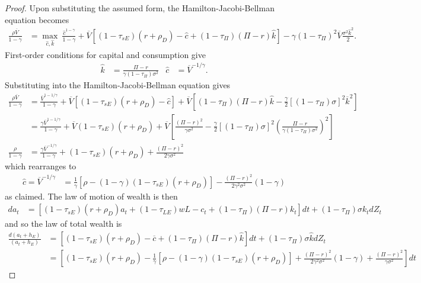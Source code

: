 \documentclass[11pt]{article}
\theoremstyle{plain}
\theoremstyle{definition} %
\begin{document}
\begin{proof}
Upon substituting the assumed form, the Hamilton-Jacobi-Bellman equation becomes 
\begin{align*}
\frac{\rho \overline{V}}{1-\gamma} & = \max_{\hat{c}, \hat{k}} \ \frac{\hat{c}^{1-\gamma}}{1-\gamma} + \overline{V}{\left[(1-\tau_{sE})(r+\rho_D) - \hat{c} + (1-\tau_{\Pi})(\Pi - r)\hat{k}\right]} - \gamma(1-\tau_{\Pi})^2\overline{V}\frac{\sigma^2\hat{k}^2}{2}.
\end{align*}
First-order conditions for capital and consumption give
\begin{align*}
\hat{k} & = \frac{\Pi - r}{\gamma (1-\tau_{\Pi})\sigma^2} &
\hat{c} & = \overline{V}^{-1/\gamma}.
\end{align*}
Substituting into the Hamilton-Jacobi-Bellman equation gives 
\begin{align*}
\frac{\rho \overline{V}}{1-\gamma} & =  \frac{\overline{V}^{1-1/\gamma} }{1-\gamma} + \overline{V}{\left[(1-\tau_{sE})(r + \rho_D) - \hat{c} \right]} + \overline{V}{\left[ (1-\tau_{\Pi})(\Pi - r)\hat{k} - \frac{\gamma }{2} [(1-\tau_{\Pi})\sigma]^2\overline{k}^2\right]}
\\  & =  \frac{\gamma\overline{V}^{1-1/\gamma}}{1-\gamma} + \overline{V} (1-\tau_{sE})(r + \rho_D) + \overline{V}{\left[\frac{(\Pi-r)^2}{\gamma\sigma^2} - \frac{\gamma }{2} [(1-\tau_{\Pi})\sigma]^2{\left(\frac{\Pi-r}{\gamma (1-\tau_{\Pi})\sigma^2}\right)}^2\right]}
\\ \frac{\rho }{1-\gamma} & = \frac{\gamma\overline{V}^{-1/\gamma}}{1-\gamma} + (1-\tau_{sE})(r + \rho_D) + \frac{{\left(\Pi-r \right)}^2}{2\gamma\sigma^2} 
\end{align*}
which rearranges to 
\begin{align*}
\hat{c} = \overline{V}^{-1/\gamma} & = \frac{1}{\gamma} [\rho -  (1-\gamma)(1-\tau_{sE})(r+\rho_D)] - \frac{{\left(\Pi - r\right)}^2}{2\gamma^2\sigma^2} (1-\gamma)
\end{align*}
as claimed. The law of motion of wealth is then 
\begin{align*}
da_t & = {\left[(1-\tau_{sE})(r + \rho_D)a_t + (1-\tau_{LE})wL - c_t + (1 - \tau_{\Pi})(\Pi-r)k_t\right]}dt + (1-\tau_{\Pi})\sigma k_t dZ_t
\end{align*}
and so the law of total wealth is
\begin{align*}
\frac{d(a_t + h_E)}{(a_t + h_E)} & = {\left[(1-\tau_{sE})(r + \rho_D) - \overline{c} + (1-\tau_{\Pi})(\Pi - r)\hat{k}\right]}dt + (1-\tau_{\Pi})\sigma \hat{k} dZ_t
\\ & = {\left[(1-\tau_{sE})(r + \rho_D) - \frac{1}{\gamma} [\rho - (1-\gamma)(1-\tau_{sE})(r+\rho_D)] + \frac{{\left(\Pi-r\right)}^2}{2\gamma^2\sigma^2} (1-\gamma) + \frac{(\Pi-r)^2}{\gamma \sigma^2}\right]}dt 

\end{align*}
\end{proof}
\end{document}
